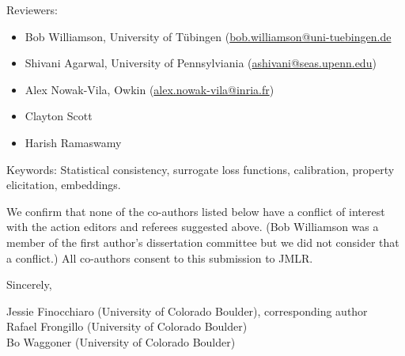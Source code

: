 Reviewers:
\begin{itemize}
    \item Bob Williamson, University of T\"ubingen (\url{bob.williamson@uni-tuebingen.de}
    \item Shivani Agarwal, University of Pennsylviania (\url{ashivani@seas.upenn.edu})
    \item Alex Nowak-Vila, Owkin (\url{alex.nowak-vila@inria.fr})
    \item Clayton Scott
    \item Harish Ramaswamy
\end{itemize}

Keywords: Statistical consistency, surrogate loss functions, calibration, property elicitation, embeddings.

We confirm that none of the co-authors listed below have a conflict of interest with the action editors and referees suggested above.
(Bob Williamson was a member of the first author's dissertation committee but we did not consider that a conflict.)
All co-authors consent to this submission to JMLR.

\bigskip

Sincerely,

\medskip

Jessie Finocchiaro (University of Colorado Boulder), corresponding author\\
Rafael Frongillo (University of Colorado Boulder)\\
Bo Waggoner (University of Colorado Boulder)








































